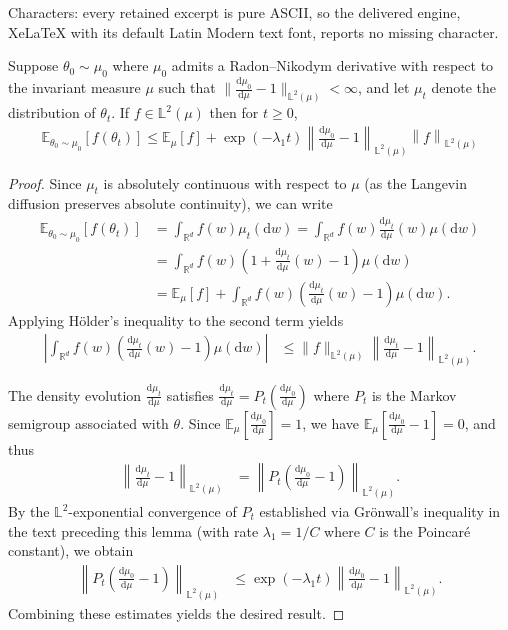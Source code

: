 \documentclass[10pt,a4paper]{amsart}
\newcommand{\E}{\mathbb{E}}
\newcommand{\R}{\mathbb{R}}
\newcommand{\bL}{\mathbb{L}}
\newcommand{\lb}{\left}
\newcommand{\rb}{\right}
\renewcommand{\d}{\mathrm{d}}
\begin{document}
Characters: every retained excerpt is pure ASCII, so the delivered engine, XeLaTeX with its default Latin Modern text font, reports no missing character.
\begin{lemma}\label{lem:burnin}
Suppose $\theta_0\sim \mu_0$ where $\mu_0$ admits a Radon--Nikodym derivative with respect to the invariant measure $\mu$ such that $\|\frac{\d\mu_0}{\d\mu}-1\|_{\bL^2(\mu)}<\infty$, and let $\mu_t$ denote the distribution of $\theta_t$. If $f\in \bL^2(\mu)$ then for $t\ge0$,
\begin{align*}
\E_{\theta_0\sim\mu_0}\lb[f(\theta_t) \rb]\le \E_\mu[f]+
\exp\lb(-\lambda_1 t\rb)\lb\|\frac{\d\mu_0}{\d\mu}-1\rb\|_{\bL^2(\mu)}\lb\|f\rb\|_{\bL^2(\mu)}
\end{align*}
\end{lemma}

\begin{proof}
{Since $\mu_t$ is absolutely continuous with respect to $\mu$ (as the Langevin diffusion preserves absolute continuity), we can write}
\begin{align*}
\E_{\theta_0\sim\mu_0}\lb[f(\theta_t)\rb] 
&= \int_{\R^d} f(w) \mu_t(\d w) = \int_{\R^d} f(w) \frac{\d\mu_t}{\d\mu}(w) \mu(\d w)\\
&= \int_{\R^d} f(w) \lb(1 + \frac{\d\mu_t}{\d\mu}(w) - 1\rb) \mu(\d w)\\
&= \E_\mu[f] + \int_{\R^d} f(w) \lb(\frac{\d\mu_t}{\d\mu}(w) - 1\rb) \mu(\d w).
\end{align*}
{Applying H\"{o}lder's inequality to the second term yields
\begin{align*}
\lb|\int_{\R^d} f(w) \lb(\frac{\d\mu_t}{\d\mu}(w) - 1\rb) \mu(\d w)\rb|
&\leq \|f\|_{\bL^2(\mu)} \lb\|\frac{\d\mu_t}{\d\mu} - 1\rb\|_{\bL^2(\mu)}.
\end{align*}}

{The density evolution $\frac{\d\mu_t}{\d\mu}$ satisfies $\frac{\d\mu_t}{\d\mu} = P_t\lb(\frac{\d\mu_0}{\d\mu}\rb)$ where $P_t$ is the Markov semigroup associated with $\theta$. Since $\E_\mu\lb[\frac{\d\mu_0}{\d\mu}\rb] = 1$, we have $\E_\mu\lb[\frac{\d\mu_0}{\d\mu} - 1\rb] = 0$, and thus}
\begin{align*}
\lb\|\frac{\d\mu_t}{\d\mu} - 1\rb\|_{\bL^2(\mu)} 
&= \lb\|P_t\lb(\frac{\d\mu_0}{\d\mu} - 1\rb)\rb\|_{\bL^2(\mu)}.
\end{align*}
{By the $\bL^2$-exponential convergence of $P_t$ established via Gr\"{o}nwall's inequality in the text preceding this lemma (with rate $\lambda_1 = 1/C$ where $C$ is the Poincar\'{e} constant), we obtain
\begin{align*}
\lb\|P_t\lb(\frac{\d\mu_0}{\d\mu} - 1\rb)\rb\|_{\bL^2(\mu)}
&\leq \exp\lb(-\lambda_1 t\rb) \lb\|\frac{\d\mu_0}{\d\mu} - 1\rb\|_{\bL^2(\mu)}.
\end{align*}
Combining these estimates yields the desired result.}
\end{proof}
\end{document}
